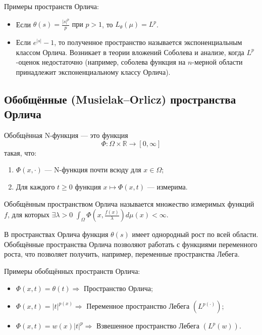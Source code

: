 \documentclass[../NDCNNAI_main.tex]{subfiles}
\begin{document}
Примеры пространств Орлича:
\begin{itemize}
    \item Если $\theta(s)=\frac{|s|^p}{p}\text{ при }p>1$, то $L_\theta(\mu)=L^p$.
    \item Если $e^{|s|}-1$, то полученное пространство называется экспоненциальным классом Орлича.
    Возникает в теории вложений Соболева и анализе,
    когда $L^p$-оценок недостаточно (например, соболева функция на $n$-мерной области принадлежит экспоненциальному классу Орлича).
\end{itemize}

\subsection{Обобщённые (Musielak–Orlicz) пространства Орлича}

\begin{definition}
Обобщённая N-функция --- это функция 
$$\Phi\colon\Omega \times\mathbb{R}\to[0,\infty]$$
такая, что:
    \begin{enumerate}
        \item $\Phi(x,\cdot)$ --- N-функция почти всюду для $x\in\Omega$;
        \item Для каждого $t\ge0$ функция $x\mapsto\Phi(x,t)$ --- измерима.
    \end{enumerate}
\end{definition}

\begin{definition}
Обобщённым пространством Орлича называется множество измеримых функций $f$, для которых $\exists\lambda>0$ $\int_\Omega\Phi(x,\frac{f(x)}{\lambda})d\mu(x)<\infty$.
\end{definition}

\begin{remark}
В пространствах Орлича функция $\theta(s)$ имеет однородный рост по всей области.
Обобщённые пространства Орлича позволяют работать с функциями переменного роста,
что позволяет получить, например, переменные пространства Лебега.
\end{remark}

Примеры обобщённых пространств Орлича:
\begin{itemize}
    \item $\Phi(x,t)=\theta(t)\Longrightarrow$ Пространство Орлича;
    \item $\Phi(x,t)=|t|^{p(x)}\Longrightarrow$ Переменное пространство Лебега $(L^{p(\cdot)})$;
    \item $\Phi(x,t)=w(x)|t|^{p}\Longrightarrow$ Взвешенное пространство Лебега $(L^p(w))$.
\end{itemize}
\end{document}
